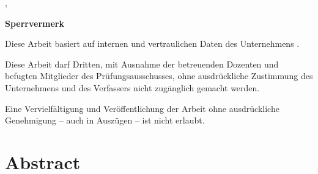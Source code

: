 \vspace{1cm}
\dhbwort, \dhbwdatum \\

\vspace{1.2cm}						                                      
\dhbwautor

%
{%
\vspace{11cm}
\color{red}\textsf{\large\textbf{Sperrvermerk}}

Diese Arbeit basiert auf internen und vertraulichen Daten des Unternehmens \dhbwfirma.

Diese Arbeit darf Dritten, mit Ausnahme der betreuenden Dozenten und befugten Mitglieder des Prüfungsausschusses, ohne ausdrückliche Zustimmung des Unternehmens und des Verfassers nicht zugänglich gemacht werden.

Eine Vervielfältigung und Veröffentlichung der Arbeit ohne ausdrückliche Genehmigung -- auch in Auszügen -- ist nicht erlaubt.
\color{black}
}{}

\cleardoublepage

\chapter*{Abstract}

%
  {\subsubsection*{\dhbwtitelde}\dhbwabstractde\subsubsection*{\dhbwtitelen}\dhbwabstracten}
  {\subsubsection*{\dhbwtitelen}\dhbwabstracten\subsubsection*{\dhbwtitelde}\dhbwabstractde}

